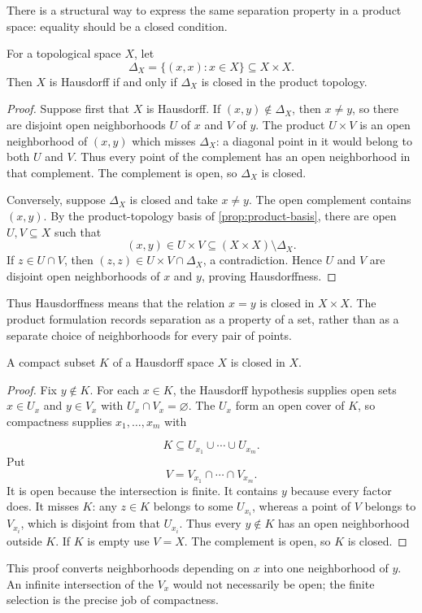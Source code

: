 There is a structural way to express the same separation property in a
product space: equality should be a closed condition.
\begin{proposition}\label{prop:hausdorff-diagonal}
For a topological space $X$, let
\[
\Delta_X=\{(x,x):x\in X\}\subseteq X\times X.
\]
Then $X$ is Hausdorff if and only if $\Delta_X$ is closed in the product topology.
\end{proposition}
\begin{proof}
Suppose first that $X$ is Hausdorff. If $(x,y)\notin\Delta_X$, then
$x\ne y$, so there are disjoint open neighborhoods $U$ of $x$ and $V$
of $y$. The product $U\times V$ is an open neighborhood of $(x,y)$
which misses $\Delta_X$: a diagonal point in it would belong to both
$U$ and $V$. Thus every point of the complement has an open neighborhood
in that complement. The complement is open, so $\Delta_X$ is closed.

Conversely, suppose $\Delta_X$ is closed and take $x\ne y$. The open
complement contains $(x,y)$. By the product-topology basis of \cref{prop:product-basis}, there are
open $U,V\subseteq X$ such that
\[
(x,y)\in U\times V\subseteq (X\times X)\setminus\Delta_X.
\]
If $z\in U\cap V$, then $(z,z)\in U\times V\cap\Delta_X$, a
contradiction. Hence $U$ and $V$ are disjoint open neighborhoods of
$x$ and $y$, proving Hausdorffness.
\end{proof}
Thus Hausdorffness means that the relation $x=y$ is closed in $X\times X$.
The product formulation records separation as a property of a set, rather
than as a separate choice of neighborhoods for every pair of points.

\begin{theorem}\label{thm:compact-closed}
A compact subset $K$ of a Hausdorff space $X$ is closed in $X$.
\end{theorem}
\begin{proof}
Fix $y\notin K$. For each $x\in K$, the Hausdorff hypothesis supplies
open sets $x\in U_x$ and $y\in V_x$ with $U_x\cap V_x=\varnothing$.
The $U_x$ form an open cover of $K$, so compactness supplies $x_1,\ldots,x_m$ with

\[
K\subseteq U_{x_1}\cup\cdots\cup U_{x_m}.
\]
 Put
\[
V=V_{x_1}\cap\cdots\cap V_{x_m}.
\]
It is open because the intersection is finite. It contains $y$ because
every factor does. It misses $K$: any $z\in K$ belongs to some $U_{x_i}$,
whereas a point of $V$ belongs to $V_{x_i}$, which is disjoint from that
$U_{x_i}$. Thus every $y\notin K$ has an open neighborhood outside $K$.
If $K$ is empty use $V=X$. The complement is open, so $K$ is closed.
\end{proof}
This proof converts neighborhoods depending on $x$ into one neighborhood of
$y$. An infinite intersection of the $V_x$ would not necessarily be open;
the finite selection is the precise job of compactness.

